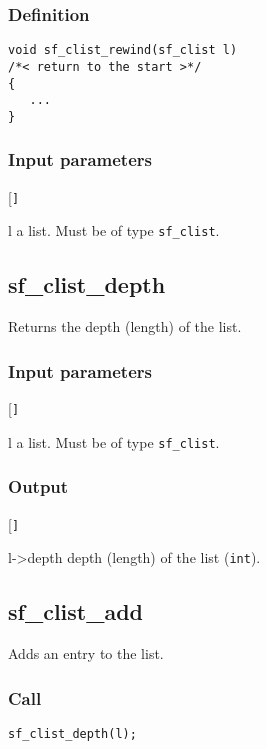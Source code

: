 \subsubsection*{Definition}
\begin{verbatim}
void sf_clist_rewind(sf_clist l)
/*< return to the start >*/
{
   ...
}
\end{verbatim}

\subsubsection*{Input parameters}
\begin{desclist}{\tt }{\quad}[\tt ]
   \setlength\itemsep{0pt}
   \item[l] a list. Must be of type \texttt{sf\_clist}.  
\end{desclist}




\subsection{{sf\_clist\_depth}}
Returns the depth (length) of the list.

\subsubsection*{Input parameters}
\begin{desclist}{\tt }{\quad}[\tt ]
   \setlength\itemsep{0pt}
   \item[l] a list. Must be of type \texttt{sf\_clist}.  
\end{desclist}

\subsubsection*{Output}
\begin{desclist}{\tt }{\quad}[\tt ]
   \setlength\itemsep{0pt}
   \item[l->depth] depth (length) of the list (\texttt{int}).  
\end{desclist}




\subsection{{sf\_clist\_add}}
Adds an entry to the list.

\subsubsection*{Call}
\begin{verbatim}sf_clist_depth(l);\end{verbatim}


